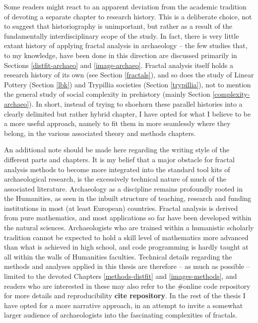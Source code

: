 \documentclass[
  12pt,
  a4paper, twoside]{book}
\begin{document}
Some readers might react to an apparent deviation from the academic tradition of devoting a separate chapter to research history. This is a deliberate choice, not to suggest that historiography is unimportant, but rather as a result of the fundamentally interdisciplinary scope of the study. In fact, there is very little extant history of applying fractal analysis in archaeology -- the few studies that, to my knowledge, have been done in this direction are discussed primarily in Sections \ref{distfit-archaeo} and \ref{image-archaeo}. Fractal analysis itself holds a research history of its own (see Section \ref{fractals}), and so does the study of Linear Pottery (Section \ref{lbk}) and Trypillia societies (Section \ref{trypillia}), not to mention the general study of social complexity in prehistory (mainly Section \ref{complexity-archaeo}). In short, instead of trying to shoehorn these parallel histories into a clearly delimited but rather hybrid chapter, I have opted for what I believe to be a more useful approach, namely to fit them in more seamlessly where they belong, in the various associated theory and methods chapters.

An additional note should be made here regarding the writing style of the different parts and chapters. It is my belief that a major obstacle for fractal analysis methods to become more integrated into the standard tool kits of archaeological research, is the excessively technical nature of much of the associated literature. Archaeology as a discipline remains profoundly rooted in the Humanities, as seen in the inbuilt structure of teaching, research and funding institutions in most (at least European) countries. Fractal analysis is derived from pure mathematics, and most applications so far have been developed within the natural sciences. Archaeologists who are trained within a humanistic scholarly tradition cannot be expected to hold a skill level of mathematics more advanced than what is achieved in high school, and code programming is hardly taught at all within the walls of Humanities faculties. Technical details regarding the methods and analyses applied in this thesis are therefore -- as much as possible -- limited to the devoted Chapters \ref{methods-distfit} and \ref{images-methods}, and readers who are interested in these may also refer to the \#online code repository for more details and reproducibility \textbf{cite repository}. In the rest of the thesis I have opted for a more narrative approach, in an attempt to invite a somewhat larger audience of archaeologists into the fascinating complexities of fractals.
\end{document}

